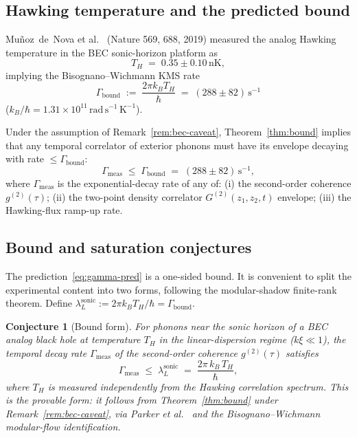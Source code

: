 \documentclass[12pt,a4paper]{article}
\newtheorem{conjecture}{Conjecture}
\begin{document}
\subsection{Hawking temperature and the predicted bound}
\label{ssec:bec-bound}

Mu\~{n}oz~de~Nova et al.~\cite{Steinhauer2019} (Nature 569, 688, 2019)
measured the analog Hawking temperature in the BEC sonic-horizon
platform as
\begin{equation}
  T_H \;=\; 0.35 \pm 0.10\,\mathrm{nK},
\end{equation}
implying the Bisognano--Wichmann KMS rate
\begin{equation}
  \boxed{\;
  \Gamma_{\mathrm{bound}}
  \;:=\;
  \frac{2\pi k_B T_H}{\hbar}
  \;=\;
  (288 \pm 82)\,\mathrm{s}^{-1}
  \;}
  \label{eq:gamma-bound}
\end{equation}
($k_B/\hbar = 1.31 \times 10^{11}\,\mathrm{rad}\,\mathrm{s}^{-1}\,\mathrm{K}^{-1}$).

Under the assumption of Remark~\ref{rem:bec-caveat}, Theorem~\ref{thm:bound}
implies that any temporal correlator of exterior phonons must have its
envelope decaying with rate $\le \Gamma_{\mathrm{bound}}$:
\begin{equation}
  \Gamma_{\mathrm{meas}}
  \;\le\;
  \Gamma_{\mathrm{bound}}
  \;=\;
  (288 \pm 82)\,\mathrm{s}^{-1},
  \label{eq:gamma-pred}
\end{equation}
where $\Gamma_{\mathrm{meas}}$ is the exponential-decay rate of any
of: (i) the second-order coherence $g^{(2)}(\tau)$; (ii) the
two-point density correlator $G^{(2)}(z_1,z_2,t)$ envelope;
(iii) the Hawking-flux ramp-up rate.

\subsection{Bound and saturation conjectures}
\label{ssec:bec-conjectures}

The prediction~\eqref{eq:gamma-pred} is a one-sided bound.  It is
convenient to split the experimental content into two forms, following
the modular-shadow finite-rank theorem.  Define $\lambda_L^{\mathrm{sonic}}
:= 2\pi k_B T_H/\hbar = \Gamma_{\mathrm{bound}}$.

\begin{conjecture}[Bound form]
\label{conj:bec-bound}
For phonons near the sonic horizon of a BEC analog black hole at
temperature $T_H$ in the linear-dispersion regime ($k\xi \ll 1$), the
temporal decay rate $\Gamma_{\mathrm{meas}}$ of the second-order coherence
$g^{(2)}(\tau)$ satisfies
\begin{equation}
  \Gamma_{\mathrm{meas}} \;\le\; \lambda_L^{\mathrm{sonic}}
    \;=\; \frac{2\pi\,k_B\,T_H}{\hbar},
  \label{eq:bec-bound-conj}
\end{equation}
where $T_H$ is measured independently from the Hawking correlation spectrum.
This is the provable form: it follows from Theorem~\ref{thm:bound} under
Remark~\ref{rem:bec-caveat}, via Parker et al.~\cite{Parker2019} and the
Bisognano--Wichmann modular-flow identification.
\end{conjecture}
\end{document}

